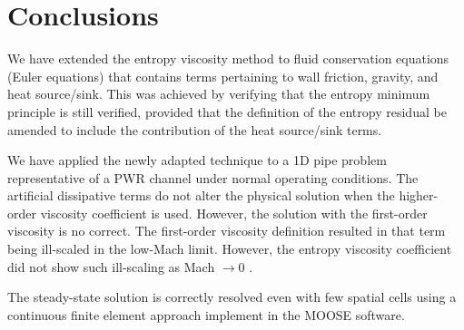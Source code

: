 \documentclass[12pt]{article}
\begin{document}
%
\section{Conclusions} 
\label{sect::ccl}

We have extended the entropy viscosity method to fluid conservation equations (Euler equations) that contains terms pertaining to wall friction, gravity, and heat source/sink. This was achieved by verifying that the entropy minimum principle is still verified, provided that the definition of the entropy residual be amended to include the contribution of the heat source/sink terms. 

We have applied the newly adapted technique to a 1D pipe problem representative of a PWR channel under normal operating conditions. The artificial dissipative terms do not alter the physical solution when the higher-order viscosity coefficient is used. However, the solution with the first-order viscosity is no correct.
The first-order viscosity definition resulted in that term being ill-scaled in the low-Mach limit. However, the entropy viscosity coefficient did not show such ill-scaling as Mach $\rightarrow 0$ .

The steady-state solution is correctly resolved even with few spatial cells using a continuous finite element approach implement in the MOOSE software.

%
%
\end{document}
